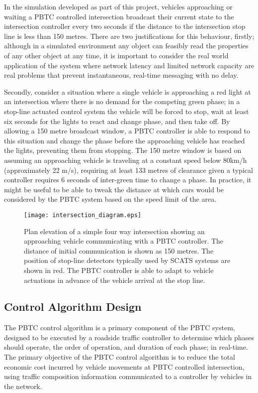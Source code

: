 In the simulation developed as part of this project, vehicles approaching or waiting a PBTC controlled intersection broadcast their current state to the intersection controller every two seconds if the distance to the intersection stop line is less than 150 metres. There are two justifications for this behaviour, firstly; although in a simulated environment any object can feasibly read the properties of any other object at any time, it is important to consider the real world application of the system where network latency and limited network capacity are real problems that prevent instantaneous, real-time messaging with no delay. 

Secondly, consider a situation where a single vehicle is approaching a red light at an intersection where there is no demand for the competing green phase; in a stop-line actuated control system the vehicle will be forced to stop, wait at least six seconds for the lights to react and change phase, and then take off. By allowing a 150 metre broadcast window, a PBTC controller is able to respond to this situation and change the phase before the approaching vehicle has reached the lights, preventing them from stopping. The 150 metre window is based on assuming an approaching vehicle is traveling at a constant speed below 80km/h (approximately 22 m/s), requiring at least 133 metres of clearance given a typical controller requires 6 seconds of inter-green time to change a phase. In practice, it might be useful to be able to tweak the distance at which cars would be considered by the PBTC system based on the speed limit of the area. 

\begin{figure}[]
\centering
	\texttt{[image: intersection\_diagram.eps]}
	\caption{ Plan elevation of a simple four way intersection showing an approaching vehicle communicating with a PBTC controller. The distance of initial communication is shown as 150 metres. The position of stop-line detectors typically used by SCATS systems are shown in red. The PBTC controller is able to adapt to vehicle actuations in advance of the vehicle arrival at the stop line. }
\label{intersectiondiagram}
\end{figure}

\subsection {Control Algorithm Design}
\label{sec:PBTCDesign}

The PBTC control algorithm is a primary component of the PBTC system, designed to be executed by a roadside traffic controller to determine which phases should operate, the order of operation, and duration of each phase; in real-time. The primary objective of the PBTC control algorithm is to reduce the total economic cost incurred by vehicle movements  at PBTC controlled intersection, using traffic composition information communicated to a controller by vehicles in the network. 

